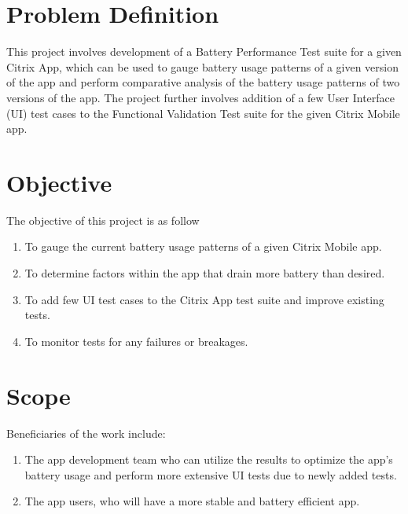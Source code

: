 \section{Problem Definition}	
This project involves development of a Battery Performance Test suite for a given Citrix App, which can be used to gauge battery usage patterns of a given version of the app and perform comparative analysis of the battery usage patterns of two versions of the app. The project further involves addition of a few User Interface (UI) test cases to the Functional Validation Test suite for the given Citrix Mobile app.
\section{Objective}
The objective of this project is as follow
\begin{enumerate}
	\item To gauge the current battery usage patterns of a given Citrix Mobile app.
	\item To determine factors within the app that drain more battery than desired.
	\item To add few UI test cases to the Citrix App test suite and improve existing tests.
	\item To monitor tests for any failures or breakages.
\end{enumerate}
\section{Scope}
Beneficiaries of the work include:
\begin{enumerate}
	\item The app development team who can utilize the results to optimize the app’s battery usage and perform more extensive UI tests due to newly added tests.
	\item The app users, who will have a more stable and battery efficient app.
\end{enumerate}